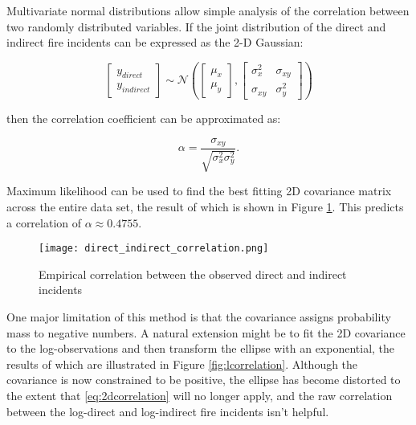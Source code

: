 \documentclass[a4paper,11pt]{report}
\begin{document}
Multivariate normal distributions allow simple analysis of the correlation between two randomly distributed variables. If the joint distribution of the direct and indirect fire incidents can be expressed as the 2-D Gaussian:

\begin{equation} \label{eq:2dmvg}
\left[ \begin{array}{cc}
y_{direct} \\
y_{indirect} \end{array} \right]
\sim
\mathcal{N} \left( \left[ \begin{array}{cc}
\mu_x \\
\mu_y \end{array} \right], \left[ \begin{array}{cc}
\sigma_{x}^2 & \sigma_{xy} \\
\sigma_{xy} & \sigma_{y}^2  \end{array} \right] \right)
\end{equation}


then the correlation coefficient can be approximated as:

\begin{equation} \label{eq:2dcorrelation}
\alpha = \frac{\sigma_{xy}}{\sqrt{\sigma_{x}^2 \sigma_{y}^2}}.
\end{equation}

Maximum likelihood can be used to find the best fitting 2D covariance matrix across the entire data set, the result of which is shown in Figure \ref{fig:correlation}. This predicts a correlation of \(\alpha \approx 0.4755\). \\

\begin{figure}
\centering
\texttt{[image: direct\_indirect\_correlation.png]}
\caption{Empirical correlation between the observed direct and indirect incidents}
\label{fig:correlation}
\end{figure}


One major limitation of this method is that the covariance assigns probability mass to negative numbers. A natural extension might be to fit the 2D covariance to the log-observations and then transform the ellipse with an exponential, the results of which are illustrated in Figure \ref{fig:lcorrelation}. Although the covariance is now constrained to be positive, the ellipse has become distorted to the extent that \ref{eq:2dcorrelation} will no longer apply, and the raw correlation between the log-direct and log-indirect fire incidents isn't helpful.
\end{document}
